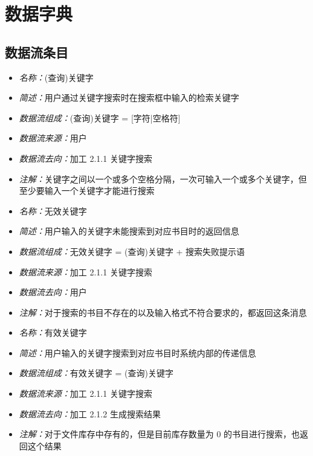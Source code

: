 \section{数据字典}
\subsection{数据流条目}

\begin{itemize}
	\item \textit{名称：}(查询)关键字
	\item \textit{简述：}用户通过关键字搜索时在搜索框中输入的检索关键字
	\item \textit{数据流组成：}(查询)关键字 = [字符|空格符]
	\item \textit{数据流来源：}用户
	\item \textit{数据流去向：}加工 2.1.1 关键字搜索
	\item \textit{注解：}关键字之间以一个或多个空格分隔，一次可输入一个或多个关键字，但至少要输入一个关键字才能进行搜索
\end{itemize}

\vspace{-1mm}

\begin{itemize}
	\item \textit{名称：}无效关键字
	\item \textit{简述：}用户输入的关键字未能搜索到对应书目时的返回信息
	\item \textit{数据流组成：}无效关键字 = (查询)关键字 + 搜索失败提示语
	\item \textit{数据流来源：}加工 2.1.1 关键字搜索
	\item \textit{数据流去向：}用户
	\item \textit{注解：}对于搜索的书目不存在的以及输入格式不符合要求的，都返回这条消息
\end{itemize}

\vspace{-1mm}

\begin{itemize}
	\item \textit{名称：}有效关键字
	\item \textit{简述：}用户输入的关键字搜索到对应书目时系统内部的传递信息
	\item \textit{数据流组成：}有效关键字 = (查询)关键字
	\item \textit{数据流来源：}加工 2.1.1 关键字搜索
	\item \textit{数据流去向：}加工 2.1.2 生成搜索结果
	\item \textit{注解：}对于文件库存中存有的，但是目前库存数量为 0 的书目进行搜索，也返回这个结果
\end{itemize}

